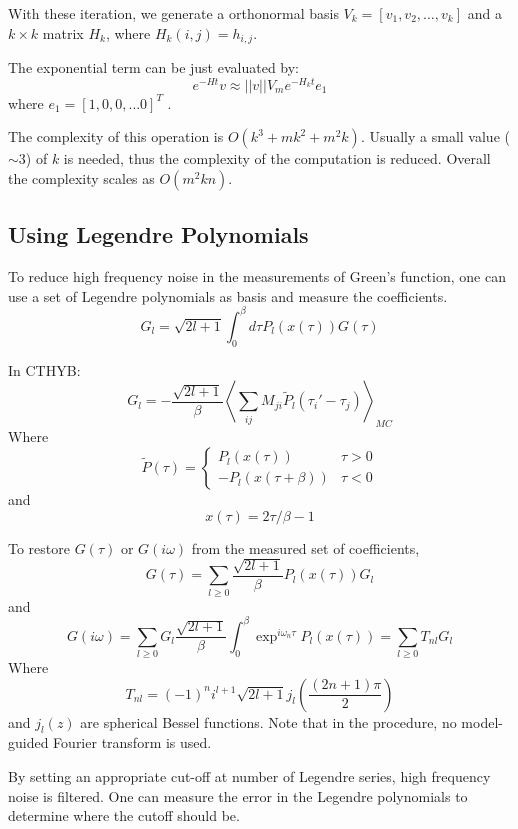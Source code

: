 With these iteration, we generate a orthonormal basis 
$V_k=[v_1,v_2,\ldots, v_k]$
and a $k\times k$ matrix $H_k$, where $H_k(i,j)=h_{i,j}$.

The exponential term can be just evaluated by:
\[
e^{-Ht}v \approx ||v|| V_m e^{-H_k t}e_1
\]
where $e_1 = [1, 0, 0, \ldots 0]^T$ . 

The complexity of this operation is $O(k^3+mk^2+m^2k)$. Usually a small value ($\sim 3$)
of $k$ is needed, thus the complexity of the computation is reduced. 
Overall the complexity scales as $O(m^2kn)$.



\subsection{Using Legendre Polynomials}

To reduce high frequency noise in the measurements of Green's function, 
one can use a set of Legendre polynomials as basis and measure the coefficients. 
\[
G_l=\sqrt{2l+1}\int_0^\beta d\tau P_l(x(\tau))G(\tau)
\]

In CTHYB:
\[
G_l=-\frac{\sqrt{2l+1}}{\beta}\left\langle\sum_{ij}M_{ji}\tilde{P}_l(\tau_i'-\tau_j)\right\rangle_{MC}
\]
Where
\[
\tilde{P}(\tau)=\left\{
\begin{array}{ll}
  P_l(x(\tau))& \tau >0\\
  -P_l(x(\tau+\beta))&\tau<0
\end{array}
\right.
\]
and \[
x(\tau)=2\tau/\beta-1
\]

To restore $G(\tau)$ or $G(i\omega)$ from the measured set of coefficients,
\[
G(\tau) = \sum_{l\ge 0}\frac{\sqrt{2l+1}}{\beta}P_l(x(\tau))G_l
\]
and
\[
G(i\omega) = \sum_{l\ge 0} G_l\frac{\sqrt{2l+1}}{\beta}\int_0^\beta\exp^{i\omega_n\tau}P_l(x(\tau))=\sum_{l\ge 0}T_{nl}G_l
\]
Where
\[
T_{nl}=(-1)^ni^{l+1}\sqrt{2l+1}j_l\left(\frac{(2n+1)\pi}{2}\right)
\]
and $j_l(z)$ are spherical Bessel functions. Note that in the procedure, no model-guided Fourier transform is used.

By setting an appropriate cut-off at number of Legendre series, high frequency noise is filtered. 
One can measure the error in the Legendre polynomials to determine where the cutoff should be.




